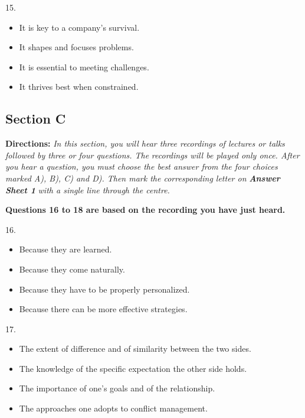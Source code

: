 \documentclass[UTF8,11pt]{ctexart}
\begin{document}
15.


\begin{itemize}[leftmargin=2em,itemsep=.2em,topsep=.4em]\item[A.] It is key to a company’s survival.
\item[B.] It shapes and focuses problems.
\item[C.] It is essential to meeting challenges.
\item[D.] It thrives best when constrained.
\end{itemize}

\subsection*{\textbf{Section C}}


\textbf{Directions:}\textit{ In this section, you will hear three recordings of lectures or talks followed by three or four questions. The} \textit{recordings will be played only once. After you hear a question, you must choose the best answer from the four choices} \textit{marked A), B), C) and D). Then mark the corresponding letter on }\textbf{\textit{Answer Sheet 1}}\textit{ with a single line through the centre.}


\textbf{Questions 16 to 18 are based on the recording you have just heard.}


16.


\begin{itemize}[leftmargin=2em,itemsep=.2em,topsep=.4em]\item[A.] Because they are learned.
\item[B.] Because they come naturally.
\item[C.] Because they have to be properly personalized.
\item[D.] Because there can be more effective strategies.
\end{itemize}

17.


\begin{itemize}[leftmargin=2em,itemsep=.2em,topsep=.4em]\item[A.] The extent of difference and of similarity between the two sides.
\item[B.] The knowledge of the specific expectation the other side holds.
\item[C.] The importance of one’s goals and of the relationship.
\item[D.] The approaches one adopts to conflict management.
\end{itemize}
\end{document}
